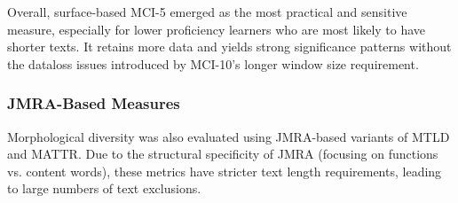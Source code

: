 Overall, surface-based MCI-5 emerged as the most practical and sensitive measure, especially for lower proficiency
learners who are most likely to have shorter texts. It retains more data and yields strong significance patterns
without the dataloss issues introduced by MCI-10's longer window size requirement.

\subsubsection{JMRA-Based Measures}

Morphological diversity was also evaluated using JMRA-based variants of MTLD and MATTR. Due to the structural
specificity of JMRA (focusing on functions vs. content words), these metrics have stricter text length requirements,
leading to large numbers of text exclusions.

